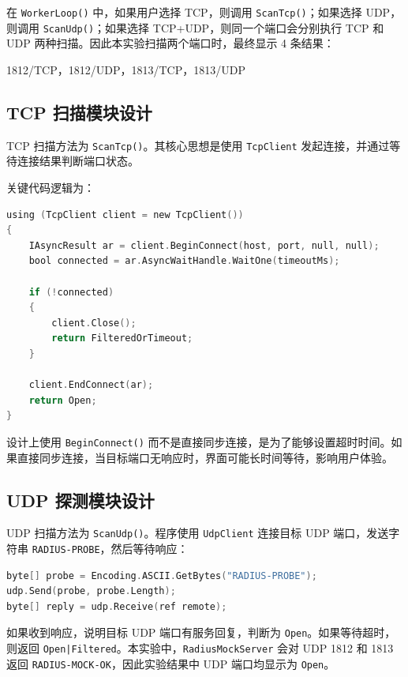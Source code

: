 \documentclass[UTF8,a4paper,12pt]{ctexart}
\begin{document}
在 \texttt{WorkerLoop()} 中，如果用户选择 TCP，则调用 \texttt{ScanTcp()}；如果选择 UDP，则调用 \texttt{ScanUdp()}；如果选择 TCP+UDP，则同一个端口会分别执行 TCP 和 UDP 两种扫描。因此本实验扫描两个端口时，最终显示 4 条结果：

\begin{center}
1812/TCP，1812/UDP，1813/TCP，1813/UDP
\end{center}

\subsection{TCP 扫描模块设计}

TCP 扫描方法为 \texttt{ScanTcp()}。其核心思想是使用 \texttt{TcpClient} 发起连接，并通过等待连接结果判断端口状态。

关键代码逻辑为：

\begin{lstlisting}[language=C]
using (TcpClient client = new TcpClient())
{
    IAsyncResult ar = client.BeginConnect(host, port, null, null);
    bool connected = ar.AsyncWaitHandle.WaitOne(timeoutMs);

    if (!connected)
    {
        client.Close();
        return FilteredOrTimeout;
    }

    client.EndConnect(ar);
    return Open;
}
\end{lstlisting}

设计上使用 \texttt{BeginConnect()} 而不是直接同步连接，是为了能够设置超时时间。如果直接同步连接，当目标端口无响应时，界面可能长时间等待，影响用户体验。

\subsection{UDP 探测模块设计}

UDP 扫描方法为 \texttt{ScanUdp()}。程序使用 \texttt{UdpClient} 连接目标 UDP 端口，发送字符串 \texttt{RADIUS-PROBE}，然后等待响应：

\begin{lstlisting}[language=C]
byte[] probe = Encoding.ASCII.GetBytes("RADIUS-PROBE");
udp.Send(probe, probe.Length);
byte[] reply = udp.Receive(ref remote);
\end{lstlisting}

如果收到响应，说明目标 UDP 端口有服务回复，判断为 \texttt{Open}。如果等待超时，则返回 \texttt{Open|Filtered}。本实验中，\texttt{RadiusMockServer} 会对 UDP 1812 和 1813 返回 \texttt{RADIUS-MOCK-OK}，因此实验结果中 UDP 端口均显示为 \texttt{Open}。
\end{document}
